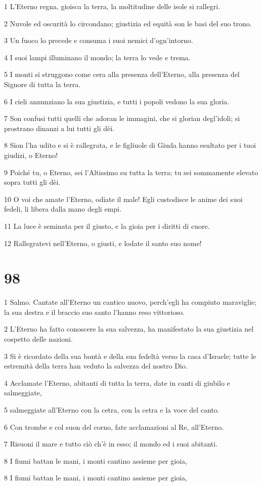 \par 1 L'Eterno regna, gioisca la terra, la moltitudine delle isole si rallegri.
\par 2 Nuvole ed oscurità lo circondano; giustizia ed equità son le basi del suo trono.
\par 3 Un fuoco lo precede e consuma i suoi nemici d'ogn'intorno.
\par 4 I suoi lampi illuminano il mondo; la terra lo vede e trema.
\par 5 I monti si struggono come cera alla presenza dell'Eterno, alla presenza del Signore di tutta la terra.
\par 6 I cieli annunziano la sua giustizia, e tutti i popoli vedono la sua gloria.
\par 7 Son confusi tutti quelli che adoran le immagini, che si glorian degl'idoli; si prostrano dinanzi a lui tutti gli dèi.
\par 8 Sion l'ha udito e si è rallegrata, e le figliuole di Giuda hanno esultato per i tuoi giudizi, o Eterno!
\par 9 Poiché tu, o Eterno, sei l'Altissimo su tutta la terra; tu sei sommamente elevato sopra tutti gli dèi.
\par 10 O voi che amate l'Eterno, odiate il male! Egli custodisce le anime dei suoi fedeli, li libera dalla mano degli empi.
\par 11 La luce è seminata per il giusto, e la gioia per i diritti di cuore.
\par 12 Rallegratevi nell'Eterno, o giusti, e lodate il santo suo nome!

\chapter{98}

\par 1 Salmo. Cantate all'Eterno un cantico nuovo, perch'egli ha compiuto maraviglie; la sua destra e il braccio suo santo l'hanno reso vittorioso.
\par 2 L'Eterno ha fatto conoscere la sua salvezza, ha manifestato la sua giustizia nel cospetto delle nazioni.
\par 3 Si è ricordato della sua bontà e della sua fedeltà verso la casa d'Israele; tutte le estremità della terra han veduto la salvezza del nostro Dio.
\par 4 Acclamate l'Eterno, abitanti di tutta la terra, date in canti di giubilo e salmeggiate,
\par 5 salmeggiate all'Eterno con la cetra, con la cetra e la voce del canto.
\par 6 Con trombe e col suon del corno, fate acclamazioni al Re, all'Eterno.
\par 7 Risuoni il mare e tutto ciò ch'è in esso; il mondo ed i suoi abitanti.
\par 8 I fiumi battan le mani, i monti cantino assieme per gioia,
\par 8 I fiumi battan le mani, i monti cantino assieme per gioia,

